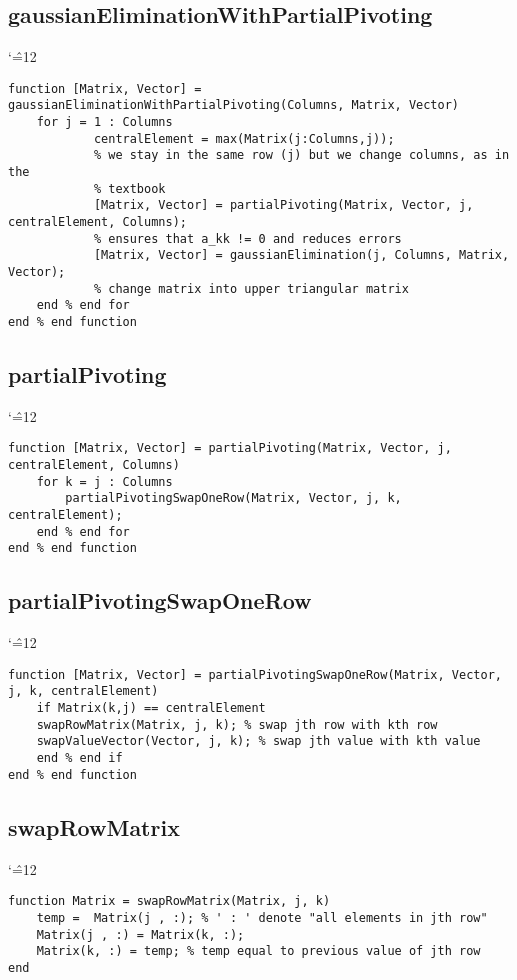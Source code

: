 \documentclass{report}
\newenvironment{simplechar}{%
   \catcode`\^=12
}{}
\begin{document}
\newpage
\subsection{gaussianEliminationWithPartialPivoting}
\begin{simplechar}
\begin{lstlisting}
function [Matrix, Vector] = gaussianEliminationWithPartialPivoting(Columns, Matrix, Vector)
    for j = 1 : Columns
            centralElement = max(Matrix(j:Columns,j));
            % we stay in the same row (j) but we change columns, as in the
            % textbook
            [Matrix, Vector] = partialPivoting(Matrix, Vector, j, centralElement, Columns);
            % ensures that a_kk != 0 and reduces errors
            [Matrix, Vector] = gaussianElimination(j, Columns, Matrix, Vector);
            % change matrix into upper triangular matrix
    end % end for
end % end function
\end{lstlisting}
\end{simplechar}

\subsection{partialPivoting}
\begin{simplechar}
\begin{lstlisting}
function [Matrix, Vector] = partialPivoting(Matrix, Vector, j, centralElement, Columns)
    for k = j : Columns
        partialPivotingSwapOneRow(Matrix, Vector, j, k, centralElement);
    end % end for
end % end function
\end{lstlisting}
\end{simplechar}

\subsection{partialPivotingSwapOneRow}
\begin{simplechar}
\begin{lstlisting}
function [Matrix, Vector] = partialPivotingSwapOneRow(Matrix, Vector, j, k, centralElement)
    if Matrix(k,j) == centralElement
    swapRowMatrix(Matrix, j, k); % swap jth row with kth row
    swapValueVector(Vector, j, k); % swap jth value with kth value
    end % end if
end % end function
\end{lstlisting}
\end{simplechar}

\newpage
\subsection{swapRowMatrix}
\begin{simplechar}
\begin{lstlisting}
function Matrix = swapRowMatrix(Matrix, j, k)
    temp =  Matrix(j , :); % ' : ' denote "all elements in jth row"
    Matrix(j , :) = Matrix(k, :);
    Matrix(k, :) = temp; % temp equal to previous value of jth row
end
\end{lstlisting}
\end{simplechar}
\end{document}
